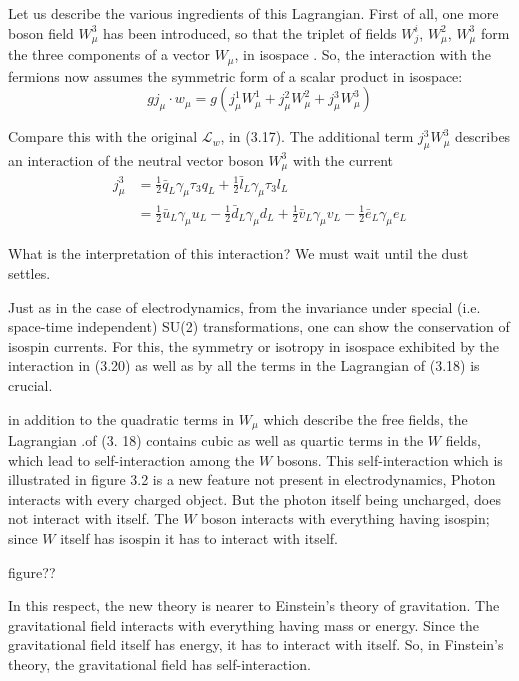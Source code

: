 Let us describe the various ingredients of this Lagrangian. First of all, one more boson field
$W^{3}_{\mu}$ has been introduced, so that the triplet of fields $W^{i}_{j}$, $W^{2}_{\mu}$, $W^{3}_{\mu}$ form the three
components of a vector $W_{\mu}$, in isospace . So, the interaction with the fermions now assumes the
symmetric form of a scalar product in isospace: 
\begin{equation*}
g j_{\mu}\cdot w_{\mu} = g(j^{1}_{\mu} W^{1}_{\mu} + j^{2}_{\mu}W^{2}_{\mu} + j^{3}_{\mu}W^{3}_{\mu})\tag{3.20}
\end{equation*}

Compare this with the original $\mathcal{L}_{w}$, in (3.17). The additional term $j^{3}_{\mu} W^{3}_{\mu}$ describes an interaction of
the neutral vector boson $W^{3}_{\mu}$ with the current 
\begin{align*}
j^{3}_{\mu} &= \frac{1}{2} \bar{q}_{L} \gamma_{\mu}\tau_{3}q_{L} + \frac{1}{2}\bar{l}_{L} \gamma_{\mu}\tau_{3}l_{L}\\
& = \frac{1}{2} \bar{u}_{L}\gamma_{\mu}u_{L}- \frac{1}{2} \bar{d}_{L}\gamma_{\mu}d_{L} + \frac{1}{2}\bar{v}_{L}\gamma_{\mu}v_{L}- \frac{1}{2}\bar{e}_{L}\gamma_{\mu}e_{L}\tag{3.21}
\end{align*}

What is the interpretation of this interaction? We must wait until the dust settles. 

Just as in the case of electrodynamics, from the invariance under special (i.e. space-time independent)
SU(2) transformations, one can show the conservation of isospin currents. For this, the symmetry
or isotropy in isospace exhibited by the interaction in (3.20) as well as by all the terms in the
Lagrangian of (3.18) is crucial. 

in addition to the quadratic terms in $W_{\mu}$ which describe the free fields, the Lagrangian .of (3. 18)
contains cubic as well as quartic terms in the $W$ fields, which lead to self-interaction among the
$W$ bosons. This self-interaction which is illustrated in figure 3.2 is a new feature not present in
electrodynamics, Photon interacts with every charged object. But the photon itself being uncharged,
does not interact with itself. The $W$ boson interacts with everything having isospin; since $W$ itself has isospin it has to interact with itself. 

figure??

In this respect, the new theory is nearer to Einstein’s theory of gravitation. The gravitational
field interacts with everything having mass or energy. Since the gravitational field itself has energy,
it has to interact with itself. So, in Finstein's theory, the gravitational field has self-interaction. 

